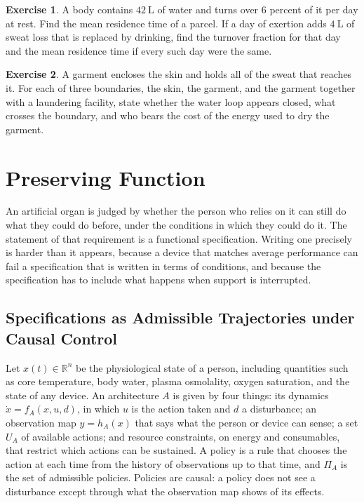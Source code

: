 \documentclass[11pt,openany]{book}
\theoremstyle{definition}
\newtheorem{exercise}{Exercise}[chapter]
\theoremstyle{remark}
\newcommand{\R}{\mathbb{R}}
\begin{document}
\begin{exercise}
A body contains $42\ \mathrm{L}$ of water and turns over $6$ percent of it per day at rest. Find the mean residence time of a parcel. If a day of exertion adds $4\ \mathrm{L}$ of sweat loss that is replaced by drinking, find the turnover fraction for that day and the mean residence time if every such day were the same.
\end{exercise}

\begin{exercise}
A garment encloses the skin and holds all of the sweat that reaches it. For each of three boundaries, the skin, the garment, and the garment together with a laundering facility, state whether the water loop appears closed, what crosses the boundary, and who bears the cost of the energy used to dry the garment.
\end{exercise}

\chapter{Preserving Function}
\label{ch:function}

An artificial organ is judged by whether the person who relies on it can still do what they could do before, under the conditions in which they could do it. The statement of that requirement is a functional specification. Writing one precisely is harder than it appears, because a device that matches average performance can fail a specification that is written in terms of conditions, and because the specification has to include what happens when support is interrupted.

\section{Specifications as Admissible Trajectories under Causal Control}

Let $x(t)\in\R^n$ be the physiological state of a person, including quantities such as core temperature, body water, plasma osmolality, oxygen saturation, and the state of any device. An architecture $A$ is given by four things: its dynamics $\dot x=f_A(x,u,d)$, in which $u$ is the action taken and $d$ a disturbance; an observation map $y=h_A(x)$ that says what the person or device can sense; a set $U_A$ of available actions; and resource constraints, on energy and consumables, that restrict which actions can be sustained. A policy is a rule that chooses the action at each time from the history of observations up to that time, and $\Pi_A$ is the set of admissible policies. Policies are causal: a policy does not see a disturbance except through what the observation map shows of its effects.
\end{document}
